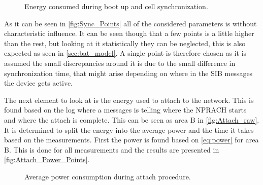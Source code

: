 \begin{figure}[H]
\centering
\begin{minipage}{0.48\textwidth}
\resizebox{\textwidth}{!}{
}
\end{minipage}
\hfill
\begin{minipage}{0.48\textwidth}
\resizebox{\textwidth}{!}{
}
\end{minipage}
\caption{Energy consumed during boot up and cell synchronization.}
\label{fig:Sync_Points}
\end{figure}

As it can be seen in \autoref{fig:Sync_Points} all of the considered parameters is without characteristic influence. It can be seen though that a few points is a little higher than the rest, but looking at it statistically they can be neglected, this is also expected as seen in \autoref{sec:bat_model}. A single point is therefore chosen as it is assumed the small discrepancies around it is due to the small difference in synchronization time, that might arise depending on where in the \gls{SIB} messages the device gets active. 

The next element to look at is the energy used to attach to the network. This is found based on the log where a messages is telling where the NPRACH starts and where the attach is complete. This can be seen as area B in \autoref{fig:Attach_raw}. It is determined to split the energy into the average power and the time it takes based on the measurements. First the power is found based on \autoref{eq:power} for area B. 
This is done for all measurements and the results are presented in \autoref{fig:Attach_Power_Points}.

\begin{figure}[H]
\centering
\begin{minipage}{0.48\textwidth}
\resizebox{\textwidth}{!}{
}
\end{minipage}
\hfill
\begin{minipage}{0.48\textwidth}
\resizebox{\textwidth}{!}{
}
\end{minipage}
\caption{Average power consumption during attach procedure.}
\label{fig:Attach_Power_Points}
\end{figure}

